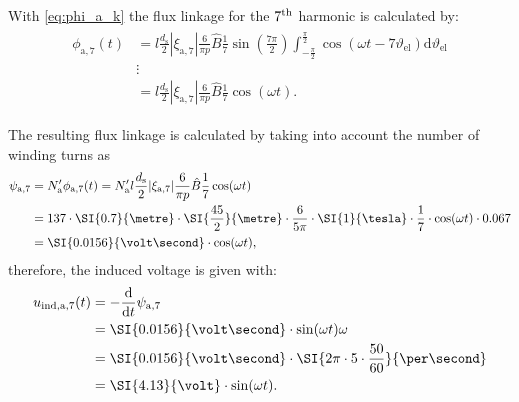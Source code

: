 \begin{solutionblock}
    With \eqref{eq:phi_a_k} the flux linkage for the $7\textsuperscript{th}$ harmonic is calculated by:
    \begin{align}
        \begin{split}
            \phi_{\mathrm{a,}7}(t) & = l \frac{d_{\mathrm{s}}}{2} |\xi_{\mathrm{a},7}|
            \frac{6}{\pi p} \hat{B}\frac{1}{7} \sin\left(\frac{7\pi}{2}\right) \int_{-\frac{\pi}{2}}^{\frac{\pi}{2}} \cos(\omega t - 7\vartheta_{\mathrm{el}}) \mathrm{d}\vartheta_{\mathrm{el}} \\
                                   & \vdots                                                                                                                                                      \\
                                   & = l \frac{d_{\mathrm{s}}}{2} |\xi_{\mathrm{a},7}|
            \frac{6}{\pi p} \hat{B} \frac{1}{7} \cos(\omega t).
        \end{split}
    \end{align}

    The resulting flux linkage is calculated by taking into account the number of winding turns as
    \begin{align}
        \begin{split}
            \psi_{\mathrm{a,}7} & = N_{\mathrm{a}}' \phi_{\mathrm{a,}7}(t)
            = N_{\mathrm{a}}' l \frac{d_{\mathrm{s}}}{2} |\xi_{\mathrm{a},7}| \frac{6}{\pi p} \hat{B} \frac{1}{7} \cos(\omega t)                                                            \\
                                & = 137 \cdot \SI{0.7}{\metre} \cdot \SI{\frac{45}{2}}{\metre} \cdot \frac{6}{5\pi} \cdot \SI{1}{\tesla} \cdot \frac{1}{7} \cdot \cos(\omega t) \cdot 0.067 \\
                                & = \SI{0.0156}{\volt\second} \cdot \cos(\omega t),
        \end{split}
    \end{align}
    therefore, the induced voltage is given with:
    \begin{align}
        \begin{split}
            u_{\mathrm{ind,a,}7}(t) & = -\frac{\mathrm{d}}{\mathrm{d}t}\psi_{\mathrm{a,}7}                               \\
                                    & = \SI{0.0156}{\volt\second} \cdot \sin(\omega t) \omega                            \\
                                    & = \SI{0.0156}{\volt\second} \cdot \SI{2\pi\cdot 5\cdot \frac{50}{60}}{\per\second} \\
                                    & = \SI{4.13}{\volt} \cdot \sin(\omega t).
        \end{split}
    \end{align}

\end{solutionblock}


